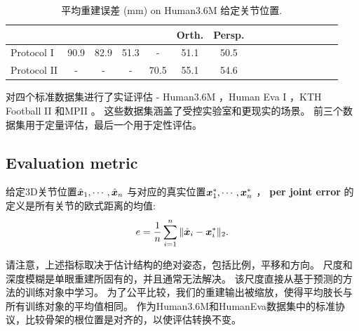 
\begin{table}
\caption{平均重建误差 (mm) on Human3.6M \cite{ionescu2014human} 给定关节位置.}\label{tab:nrsfm}
\centering
\renewcommand{\arraystretch}{1.5}
\begin{tabular}{l*{15}{c}}
\toprule
 & \cite{ramakrishna2012reconstructing} &  \cite{dai2012simple} & \cite{zhou2015sparse} & \cite{yasin2016dual} & Orth. & Persp. \\
\toprule
Protocol I & 90.9 & 82.9 & 51.3 & - & 51.1 & 50.5 \\
Protocol II & - & - & - & 70.5 & 55.1 & 54.6 \\
\toprule
\end{tabular}
\end{table}

对四个标准数据集进行了实证评估 -  Human3.6M \cite{ionescu2014human}，Human Eva I \cite{sigal2010humaneva}，KTH Football II \cite{kazemi2013multi}和MPII \cite{andriluka14cvpr}。 这些数据集涵盖了受控实验室和更现实的场景。 前三个数据集用于定量评估，最后一个用于定性评估。
\subsection{Evaluation metric} %
\label{sub:evaluation_metric}

给定3D关节位置$\hat{{\bm{x}}}_1,\cdots,\hat{{\bm{x}}}_n$ 与对应的真实位置${\bm{x}}_1^*,\cdots,{\bm{x}}_n^*$ ， \textbf{per joint error} 的定义是所有关节的欧式距离的均值:
\begin{align}\label{eq:pje}
e = \frac{1}{n}\sum_{i=1}^n\|\hat{{\bm{x}}}_i-{\bm{x}}_i^*\|_2.
\end{align}

请注意，上述指标取决于估计结构的绝对姿态，包括比例，平移和方向。 尺度和深度模糊是单眼重建所固有的，并且通常无法解决。 该尺度直接从基于预测的方法的训练对象中学习\cite{ionescu2014human,li2015,tekin2015}。 为了公平比较，我们的重建输出被缩放，使得平均肢长与所有训练对象的平均值相同。 作为Human3.6M和HumanEva数据集中的标准协议，比较骨架的根位置是对齐的，以使评估转换不变。 %

